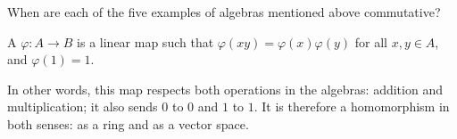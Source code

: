 \begin{ques}
When are each of the five examples of algebras mentioned above commutative?
\end{ques}

\begin{definition}
A  $\varphi:A\to B$ is a linear map such that $\varphi(xy)=\varphi(x)\varphi(y)$ for all $x,y\in A$, and $\varphi(1)=1$.
\end{definition}

In other words, this map respects both operations in the algebras: addition and multiplication; it also sends $0$ to $0$ and $1$ to $1$. It is therefore a homomorphism in both senses: as a ring and as a vector space.



